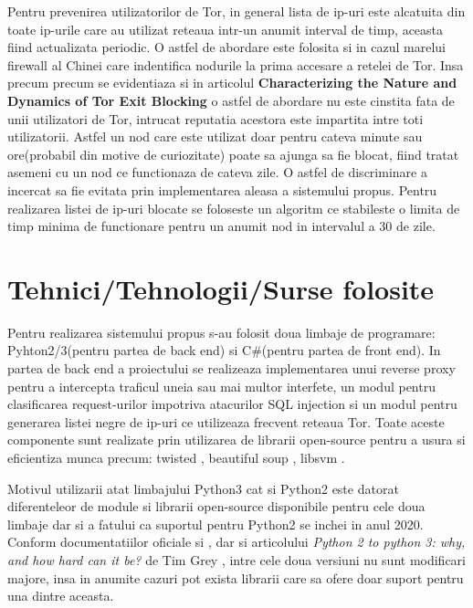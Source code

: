 Pentru prevenirea utilizatorilor de Tor, in general lista de ip-uri este alcatuita din toate ip-urile care au utilizat reteaua intr-un anumit interval de timp, aceasta fiind actualizata periodic. O astfel de abordare este folosita si in cazul marelui firewall al Chinei \cite{china_tor} care indentifica nodurile la prima accesare a retelei de Tor. Insa precum precum se evidentiaza si in articolul \textbf{Characterizing the Nature and Dynamics of Tor Exit Blocking} \cite{tor_1} o astfel de abordare nu este cinstita fata de unii utilizatori de Tor, intrucat reputatia acestora este impartita intre toti utilizatorii. Astfel un nod care este utilizat doar pentru cateva minute sau ore(probabil din motive de curiozitate) poate sa ajunga sa fie blocat, fiind tratat asemeni cu un nod ce functionaza de cateva zile. O astfel de discriminare a incercat sa fie evitata prin implementarea aleasa a sistemului propus. Pentru realizarea listei de ip-uri blocate se foloseste un algoritm ce stabileste o limita de timp minima de functionare pentru un anumit nod in intervalul a 30 de zile.


 \section{Tehnici/Tehnologii/Surse folosite}

Pentru realizarea sistemului propus s-au folosit doua limbaje de programare: Pyhton2/3(pentru partea de back end) si C\#(pentru partea de front end). In partea de back end a proiectului se realizeaza implementarea unui reverse proxy pentru a intercepta traficul uneia sau mai multor interfete, un modul pentru clasificarea request-urilor impotriva atacurilor SQL injection si un modul pentru generarea listei negre de ip-uri ce utilizeaza frecvent reteaua Tor. Toate aceste componente sunt realizate prin utilizarea de librarii open-source pentru a usura si eficientiza munca precum: twisted \cite{twisted}, beautiful soup \cite{btf_soup}, libsvm \cite{libsvm}.

Motivul utilizarii atat limbajului Python3 cat si Python2 este datorat diferenteleor de module si librarii open-source disponibile pentru cele doua limbaje dar si a fatului ca suportul pentru Python2 se inchei in anul 2020. Conform documentatiilor oficiale \cite{python3_doc} si \cite{python2_doc}, dar si articolului \textit{Python 2 to python 3: why, and how hard can it be?} de Tim Grey \cite{why_python3}, intre cele doua versiuni nu sunt modificari majore, insa in anumite cazuri pot exista librarii care sa ofere doar suport pentru una dintre aceasta.

